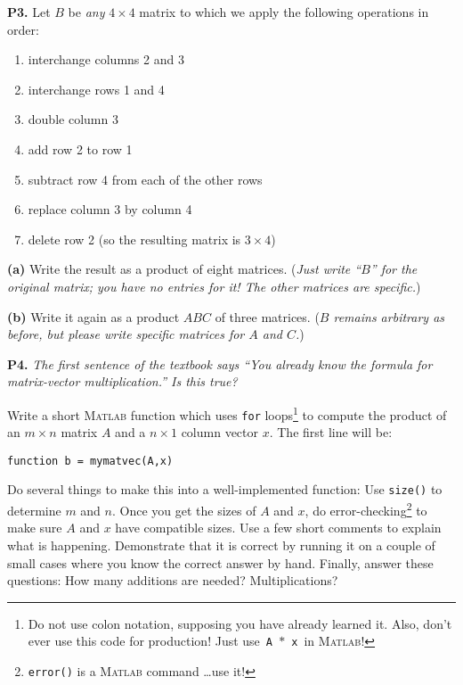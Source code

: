 \documentclass[12pt]{amsart}
\newcommand{\prob}[1]{\bigskip\noindent\textbf{#1.}\quad }
\newcommand{\epart}[1]{\medskip\noindent\textbf{(#1)}\quad }
\newcommand{\Matlab}{\textsc{Matlab}\xspace}
\begin{document}
\prob{P3} Let $B$ be \emph{any} $4\times 4$ matrix to which we apply the following operations in order:
\renewcommand{\labelenumi}{\arabic{enumi}.}
\begin{enumerate}
\item interchange columns 2 and 3
\item interchange rows 1 and 4
\item double column 3
\item add row 2 to row 1
\item subtract row 4 from each of the other rows
\item replace column 3 by column 4
\item delete row 2 (so the resulting matrix is $3\times 4$)
\end{enumerate}

\epart{a} Write the result as a product of eight matrices.  (\emph{Just write ``$B$'' for the original matrix; you have no entries for it!  The other matrices are specific.})

\epart{b} Write it again as a product $ABC$ of three matrices.  (\emph{$B$ remains arbitrary as before, but please write specific matrices for $A$ and $C$.})

\prob{P4} \emph{The first sentence of the textbook says ``You already know the formula for matrix-vector multiplication.''  Is this true?}

\smallskip
Write a short \Matlab function which uses \texttt{for} loops\footnote{Do not use colon notation, supposing you have already learned it.  Also, don't ever use this code for production!  Just use \,\texttt{A\,$\ast$\,x}\, in \Matlab!} to compute the product of an $m\times n$ matrix $A$ and a $n\times 1$ column vector $x$.  The first line will be:

\centerline{\texttt{function b = mymatvec(A,x)}}

\noindent Do several things to make this into a well-implemented function:  Use \texttt{size()} to determine $m$ and $n$.  Once you get the sizes of $A$ and $x$, do error-checking\footnote{\texttt{error()} is a \Matlab command \dots use it!} to make sure $A$ and $x$ have compatible sizes.  Use a few short comments to explain what is happening.  Demonstrate that it is correct by running it on a couple of small cases where you know the correct answer by hand.  Finally, answer these questions:  How many additions are needed?  Multiplications?
\end{document}
